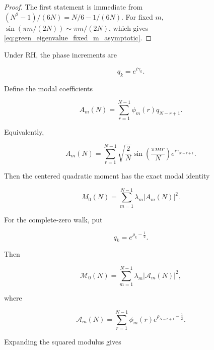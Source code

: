 \documentclass[11pt]{amsart}
\numberwithin{equation}{section}
\theoremstyle{plain}
\theoremstyle{definition}
\theoremstyle{remark}
\begin{document}
\begin{proof}
The first statement is immediate from
\((N^2-1)/(6N)=N/6-1/(6N)\). For fixed \(m\),
\(\sin(\pi m/(2N))\sim \pi m/(2N)\), which gives
\eqref{eq:green_eigenvalue_fixed_m_asymptotic}.
\end{proof}

Under RH, the phase increments are

\begin{equation}
q_k=e^{i\gamma_k}.
\label{eq:RH_phase_increments_qk}
\end{equation}

Define the modal coefficients

\begin{equation}
A_m(N)
=
\sum_{r=1}^{N-1}
\phi_m(r)
q_{N-r+1}.
\label{eq:RH_modal_coefficients_Am}
\end{equation}

Equivalently,

\begin{equation}
A_m(N)
=
\sum_{r=1}^{N-1}
\sqrt{\frac{2}{N}}
\sin\left(\frac{\pi m r}{N}\right)
e^{i\gamma_{N-r+1}}.
\label{eq:RH_modal_coefficients_Am_expanded}
\end{equation}

Then the centered quadratic moment has the exact modal identity

\begin{equation}
M_0(N)
=
\sum_{m=1}^{N-1}
\lambda_m |A_m(N)|^2.
\label{eq:M0_green_kernel_modal_identity}
\end{equation}

For the complete-zero walk, put

\begin{equation}
q_k=e^{\rho_k-\frac12}.
\label{eq:complete_zero_increments_qk}
\end{equation}

Then

\begin{equation}
\mathcal M_0(N)
=
\sum_{m=1}^{N-1}
\lambda_m |\mathcal A_m(N)|^2,
\label{eq:calM0_green_kernel_modal_identity}
\end{equation}

where

\begin{equation}
\mathcal A_m(N)
=
\sum_{r=1}^{N-1}
\phi_m(r)
e^{\rho_{N-r+1}-\frac12}.
\label{eq:complete_zero_modal_coefficients}
\end{equation}

Expanding the squared modulus gives
\end{document}
